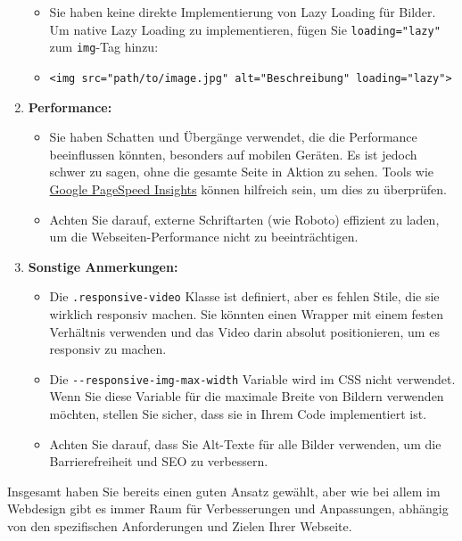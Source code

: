 \documentclass[12pt,a4paper]{scrartcl}
\newcommand{\tightlist}{
  \setlength{\itemsep}{0pt}\setlength{\parskip}{0pt}
}
\begin{document}
\begin{enumerate}
  \begin{itemize}
  \tightlist
  \item
    Sie haben keine direkte Implementierung von Lazy Loading für Bilder.
    Um native Lazy Loading zu implementieren, fügen Sie
    {\lstinline!loading="lazy"!} zum
    {\lstinline!img!}-Tag hinzu:
  \item
    {\lstinline!<img src="path/to/image.jpg" alt="Beschreibung" loading="lazy">!}
  \end{itemize}
\item
  \textbf{Performance:}

  \begin{itemize}
  \tightlist
  \item
    Sie haben Schatten und Übergänge verwendet, die die Performance
    beeinflussen könnten, besonders auf mobilen Geräten. Es ist jedoch
    schwer zu sagen, ohne die gesamte Seite in Aktion zu sehen. Tools
    wie
    \href{https://developers.google.com/speed/pagespeed/insights/}{Google
    PageSpeed Insights} können hilfreich sein, um dies zu überprüfen.
  \item
    Achten Sie darauf, externe Schriftarten (wie Roboto) effizient zu
    laden, um die Webseiten-Performance nicht zu beeinträchtigen.
  \end{itemize}
\item
  \textbf{Sonstige Anmerkungen:}

  \begin{itemize}
  \tightlist
  \item
    Die {\lstinline!.responsive-video!} Klasse ist
    definiert, aber es fehlen Stile, die sie wirklich responsiv machen.
    Sie könnten einen Wrapper mit einem festen Verhältnis verwenden und
    das Video darin absolut positionieren, um es responsiv zu machen.
  \item
    Die {\lstinline!--responsive-img-max-width!} Variable
    wird im CSS nicht verwendet. Wenn Sie diese Variable für die
    maximale Breite von Bildern verwenden möchten, stellen Sie sicher,
    dass sie in Ihrem Code implementiert ist.
  \item
    Achten Sie darauf, dass Sie Alt-Texte für alle Bilder verwenden, um
    die Barrierefreiheit und SEO zu verbessern.
  \end{itemize}
\end{enumerate}

Insgesamt haben Sie bereits einen guten Ansatz gewählt, aber wie bei
allem im Webdesign gibt es immer Raum für Verbesserungen und
Anpassungen, abhängig von den spezifischen Anforderungen und Zielen
Ihrer Webseite. %
\end{document}
